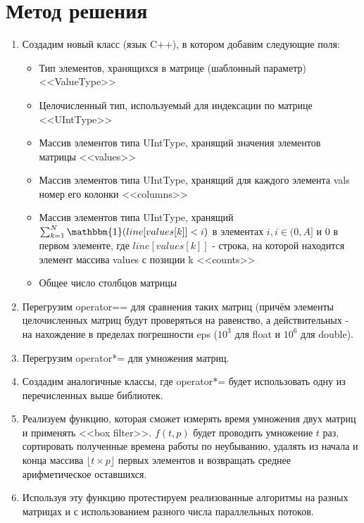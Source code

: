 \documentclass{report}
\begin{document}
\newpage
\section*{Метод решения}
\begin{enumerate}
\item Создадим новый класс (язык C++), в котором добавим следующие поля:
    \begin{itemize}
        \item Тип элементов, хранящихся в матрице (шаблонный параметр) <<ValueType>>
        \item Целочисленный тип, используемый для индексации по матрице <<UIntType>>
        \item Массив элементов типа UIntType, хранящий значения элементов матрицы <<values>>
        \item Массив элементов типа UIntType, хранящий для каждого элемента vals номер его колонки <<columns>>
        \item Массив элементов типа UIntType, хранящий $\sum_{k=1}^{N} \mathbbm{1}(line[values[k]] < i)$ в элементах $i, i \in (0, A]$ и 0 в первом элементе, где $line[values[k]]$ - строка, на которой находится элемент массива values с позиции k <<counts>>
        \item Общее число столбцов матрицы
    \end{itemize}
\item Перегрузим operator== для сравнения таких матриц (причём элементы целочисленных матриц будут проверяться на равенство, а действительных - на нахождение в пределах погрешности eps ($10^3$ для float и $10^6$ для double).
\item Перегрузим operator*= для умножения матриц.
\item Создадим аналогичные классы, где operator*= будет использовать одну из перечисленных выше библиотек.
\item Реализуем функцию, которая сможет измерять время умножения двух матриц и применять <<box filter>>. $f(t, p)$ будет проводить умножение $t$ раз, сортировать полученные времена работы по неубыванию, удалять из начала и конца массива $\lfloor t \times p \rfloor$ первых элементов и возвращать среднее арифметическое оставшихся.
\item Используя эту функцию протестируем реализованные алгоритмы на разных матрицах и с использованием разного числа параллельных потоков.
\end{enumerate}
\end{document}
